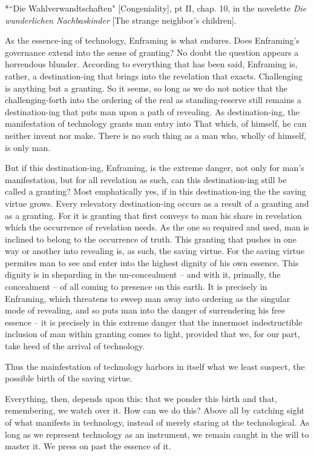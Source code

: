 \documentclass[12pt]{article}
\begin{document}
*``Die Wahlverwandtschaften" [Congeniality], pt II, chap. 10, in the novelette \textit{Die wunderlichen Nachbaskinder} [The strange neighbor's children].

As the essence-ing of technology, Enframing is what endures. Does Enframing's governance extend into the sense of granting? No doubt the question appears a horrendous blunder. According to everything that has been said, Enframing is, rather, a destination-ing that brings into the revelation that exacts. Challenging is anything but a granting. So it seems, so long as we do not notice that the challenging-forth into the ordering of the real as standing-reserve still remains a destination-ing that puts man upon a path of revealing. As destination-ing, the manifestation of technology grants man entry into That which, of himself, he can neither invent nor make. There is no such thing as a man who, wholly of himself, is only man.

But if this destination-ing, Enframing, is the extreme danger, not only for man's manifestation, but for all revelation as such, can this destination-ing still be called a granting? Most emphatically yes, if in this destination-ing the the saving virtue grows. Every relevatory destination-ing occurs as a result of a granting and as a granting. For it is granting that first conveys to man his share in revelation which the occurrence of revelation needs. As the one so required and used, man is inclined to belong to the occurrence of truth. This granting that pushes in one way or another into revealing is, as such, the saving virtue. For the saving virtue permites man to see and enter into the highest dignity of his own essence. This dignity is in sheparding in the un-concealment -- and with it, primally, the concealment -- of all coming to presence on this earth. It is precisely in Enframing, which threatens to sweep man away into ordering as the singular mode of revealing, and so puts man into the danger of surrendering his free essence -- it is precisely in this extreme danger that the innermost indestructible inclusion of man within granting comes to light, provided that we, for our part, take heed of the arrival of technology.

Thus the mainfestation of technology harbors in itself what we least suspect, the possible birth of the saving virtue. 

Everything, then, depends upon this: that we ponder this birth and that, remembering, we watch over it. How can we do this? Above all by catching sight of what manifests in technology, instead of merely staring at the technological. As long as we represent technology as an instrument, we remain caught in the will to master it. We press on past the essence of it.
\end{document}
